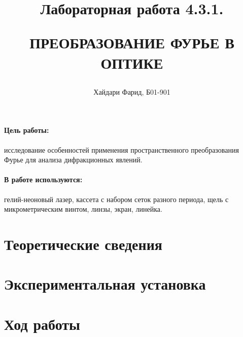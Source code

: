 \documentclass[a5paper,10pt, twoside]{article} %
\title
{
	\hfill \break	\hfill \break
	\hfill \break	\hfill \break
	Лабораторная работа 4.3.1.
	
	ПРЕОБРАЗОВАНИЕ ФУРЬЕ В ОПТИКЕ
}
\author{Хайдари Фарид, Б01-901}
\begin{document}
	
\maketitle


\thispagestyle{empty} %

\newpage

\tableofcontents %

\newpage


\paragraph{Цель работы:}

	исследование особенностей применения пространственного преобразования Фурье
	для анализа дифракционных явлений.


\paragraph{В работе используются:}

	гелий-неоновый лазер, кассета с набором
	сеток разного периода, щель с микрометрическим винтом, линзы,
	экран, линейка.

\section{Теоретические сведения}

\section{Экспериментальная установка}
	


\section{Ход работы}
\end{document}
